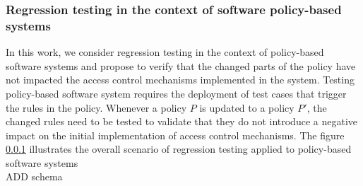 \subsubsection{Regression testing in the context of software policy-based systems}

In this work, we consider regression testing in the context of policy-based software systems and propose to verify that the changed parts of 
the policy have not impacted the access control mechanisms implemented in the system.
Testing policy-based software system requires the deployment of test cases that trigger the rules in the policy.
Whenever a policy $P$ is updated to a policy $P'$, the changed rules need to be tested to validate that they do not introduce a negative impact 
on the initial implementation of access control mechanisms. 
The figure \ref {} illustrates the overall scenario of regression testing applied to policy-based software systems\\
ADD schema





